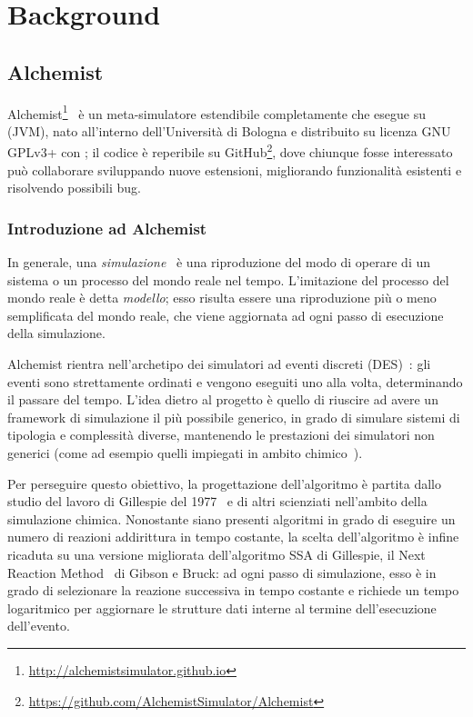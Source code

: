 
\chapter{Background}\label{ch:background}
    \section{Alchemist}\label{sec:alchemist}
        Alchemist\footnote{\url{http://alchemistsimulator.github.io}}~\cite{alchemist2013} è un meta-simulatore estendibile completamente  che esegue su  (JVM), nato all'interno dell'Università di Bologna e distribuito su licenza GNU GPLv3+ con ;
        il codice è reperibile su GitHub\footnote{\url{https://github.com/AlchemistSimulator/Alchemist}}, dove chiunque fosse interessato può collaborare sviluppando nuove estensioni, migliorando funzionalità esistenti e risolvendo possibili bug.

        \subsection{Introduzione ad Alchemist}\label{subsec:introAlchemist}
            In generale, una \emph{simulazione}~\cite{des3} è una riproduzione del modo di operare di un sistema o un processo del mondo reale nel tempo.
            L'imitazione del processo del mondo reale è detta \emph{modello};
            esso risulta essere una riproduzione più o meno semplificata del mondo reale, che viene aggiornata ad ogni passo di esecuzione della simulazione.

            Alchemist rientra nell'archetipo dei simulatori ad eventi discreti (DES)~\cite{des, des2}:
            gli eventi sono strettamente ordinati e vengono eseguiti uno alla volta, determinando il passare del tempo.
            L'idea dietro al progetto è quello di riuscire ad avere un framework di simulazione il più possibile generico, in grado di simulare sistemi di tipologia e complessità diverse, mantenendo le prestazioni dei simulatori non generici (come ad esempio quelli impiegati in ambito chimico~\cite{gillespie1976}).

            Per perseguire questo obiettivo, la progettazione dell'algoritmo è partita dallo studio del lavoro di Gillespie del 1977~\cite{gillespie1977} e di altri scienziati nell'ambito della simulazione chimica.
            Nonostante siano presenti algoritmi in grado di eseguire un numero di reazioni addirittura in tempo costante, la scelta dell'algoritmo è infine ricaduta su una versione migliorata dell'algoritmo SSA di Gillespie, il Next Reaction Method~\cite{nextReactionMethod} di Gibson e Bruck:
            ad ogni passo di simulazione, esso è in grado di selezionare la reazione successiva in tempo costante e richiede un tempo logaritmico per aggiornare le strutture dati interne al termine dell'esecuzione dell'evento.

